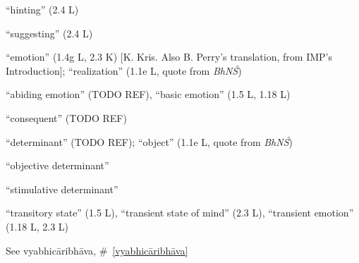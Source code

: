 \documentclass[10pt]{article}
\begin{document}
\begin{multicols}{2}
\begin{enumerate}[
			leftmargin=0em,
			rightmargin=0em,
		]
		 ``hinting'' (2.4 L)

		 ``suggesting'' (2.4 L)


		 ``emotion'' (1.4g L, 2.3 K) [K. Kris. Also B. Perry's translation, from IMP's Introduction]; ``realization'' (1.1e L, quote from \textit{BhNŚ})

		 ``abiding emotion'' (TODO REF), ``basic emotion'' (1.5 L, 1.18 L)

		 ``consequent'' (TODO REF)

		 ``determinant'' (TODO REF); ``object'' (1.1e L, quote from \textit{BhNŚ})
		\begin{enumerate}
			 ``objective determinant''

			 ``stimulative determinant''
		\end{enumerate}


		 ``transitory state'' (1.5 L), %
		``transient state of mind'' (2.3 L), %
		``transient emotion'' (1.18 L, 2.3 L)

		 See vyabhicāribhāva, \#~\ref{vyabhicāribhāva}





\end{enumerate}
\end{multicols}
\end{document}
